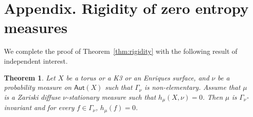 \documentclass[11pt]{article}
\newcommand\Aut{\mathsf{Aut}}
\theoremstyle{plain}
\newtheorem{thm}{Theorem}[section]
\theoremstyle{definition}
\numberwithin{equation}{section}
\begin{document}
\appendix
{}\label{app:zero_entropy}
\section*{Appendix. Rigidity of zero entropy measures}

We complete the proof of Theorem~\ref{thm:rigidity} with the following result
of independent interest.\vspace*{-5pt}\enlargethispage{.5\baselineskip}%

\begin{thm}\label{thm:entropy_every_f}
Let $X$ be a torus or a K3 or an Enriques surface,
and $\nu$ be a probability measure on
$\Aut(X)$ such that $\Gamma_\nu$ is non-elementary. Assume that $\mu$ is a Zariski diffuse
$\nu$-stationary measure such that $h_\mu(X, \nu) = 0$.
Then $\mu$ is $\Gamma_\nu$-invariant and for every
$f\in \Gamma_\nu$, $h_\mu(f)=0$.
\end{thm}
\end{document}
